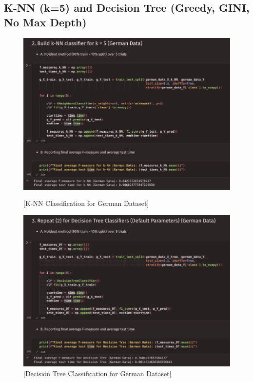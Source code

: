 \documentclass{article}
\begin{document}
    \subsection{K-NN (k=5) and Decision Tree (Greedy, GINI, No Max Depth)}
    \begin{figure}[H]
        \centering
        \begin{minipage}[t]{0.5\textwidth}
            \centering
            \includegraphics[width=\textwidth, height=0.25\textheight]{./I_2_g_a.png}
            \caption{[K-NN Classification for German Dataset]}
        \end{minipage}
        \hfill
        \begin{minipage}[t]{0.48\textwidth}
            \centering
            \includegraphics[width=\textwidth, height=0.25\textheight]{./I_2_g_b.png}
            \caption{[Decision Tree Classification for German Dataset]}
        \end{minipage}
    \end{figure}
\end{document}
